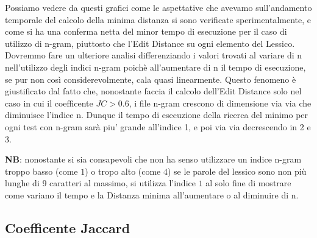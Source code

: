 \documentclass{article}
\begin{document}
Possiamo vedere da questi grafici come le aspettative che avevamo sull'andamento temporale del calcolo della minima distanza si sono verificate sperimentalmente, e come si ha una conferma netta del minor tempo di esecuzione per il caso di utilizzo di n-gram, piuttosto che l'Edit Distance su ogni elemento del Lessico. Dovremmo fare un ulteriore analisi differenziando i valori trovati al variare di n nell'utilizzo degli indici n-gram poichè all'aumentare di n il tempo di esecuzione, se pur non così considerevolmente, cala quasi linearmente. 
Questo fenomeno è giustificato dal fatto che, nonostante faccia il calcolo dell'Edit Distance solo nel caso in cui il coefficente $JC>0.6$, i file n-gram crescono di dimensione via via che diminuisce l'indice n. Dunque il tempo di esecuzione della ricerca del minimo per ogni test con n-gram sarà piu' grande all'indice 1, e poi via via decrescendo in 2 e 3.

\textbf{NB}: nonostante si sia consapevoli che non ha senso utilizzare un indice n-gram troppo basso (come $1$) o tropo alto (come $4$) se le parole del lessico sono non più lunghe di 9 caratteri al massimo, si utilizza l'indice $1$ al solo fine di mostrare come variano il tempo e la Distanza minima all'aumentare o al diminuire di n.

\subsection{Coefficente Jaccard}
\end{document}
